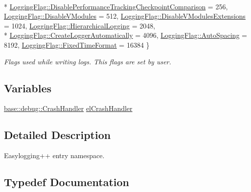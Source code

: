 \begin{DoxyCompactItemize}
\\*
\hyperlink{namespaceel_a2784aacd04cb7816ac1c0b20fcbf83cba18ea5964e8caa7c476dd5eee8e4f74a0}{Logging\+Flag\+::\+Disable\+Performance\+Tracking\+Checkpoint\+Comparison} = 256, 
\hyperlink{namespaceel_a2784aacd04cb7816ac1c0b20fcbf83cba22cae5066e8e0623cb90e20a18abb631}{Logging\+Flag\+::\+Disable\+V\+Modules} = 512, 
\hyperlink{namespaceel_a2784aacd04cb7816ac1c0b20fcbf83cba18a8e65b84ca0cc82451b5e155d7aeb4}{Logging\+Flag\+::\+Disable\+V\+Modules\+Extensions} = 1024, 
\hyperlink{namespaceel_a2784aacd04cb7816ac1c0b20fcbf83cba477de0500d7a5b64a4500d82811fc058}{Logging\+Flag\+::\+Hierarchical\+Logging} = 2048, 
\\*
\hyperlink{namespaceel_a2784aacd04cb7816ac1c0b20fcbf83cba2afa5afe77105aadedcbb90dd8547cc3}{Logging\+Flag\+::\+Create\+Logger\+Automatically} = 4096, 
\hyperlink{namespaceel_a2784aacd04cb7816ac1c0b20fcbf83cba34620f140246d3c3b68c17fdf7b8ada7}{Logging\+Flag\+::\+Auto\+Spacing} = 8192, 
\hyperlink{namespaceel_a2784aacd04cb7816ac1c0b20fcbf83cbaebbb601e28e0cf821dfe13b4a7cf409e}{Logging\+Flag\+::\+Fixed\+Time\+Format} = 16384
 \}
\begin{DoxyCompactList}\small\item\em Flags used while writing logs. This flags are set by user. \end{DoxyCompactList}\end{DoxyCompactItemize}
\subsection*{Variables}
\begin{DoxyCompactItemize}
\item 
\hyperlink{classel_1_1base_1_1debug_1_1_crash_handler}{base\+::debug\+::\+Crash\+Handler} \hyperlink{namespaceel_ab9770514f33aef6683dbba37be2b471d}{el\+Crash\+Handler}
\end{DoxyCompactItemize}


\subsection{Detailed Description}
Easylogging++ entry namespace. 

\subsection{Typedef Documentation}
\hypertarget{namespaceel_ab3cd18425a11df166a041d9024b8b5c6}{}
